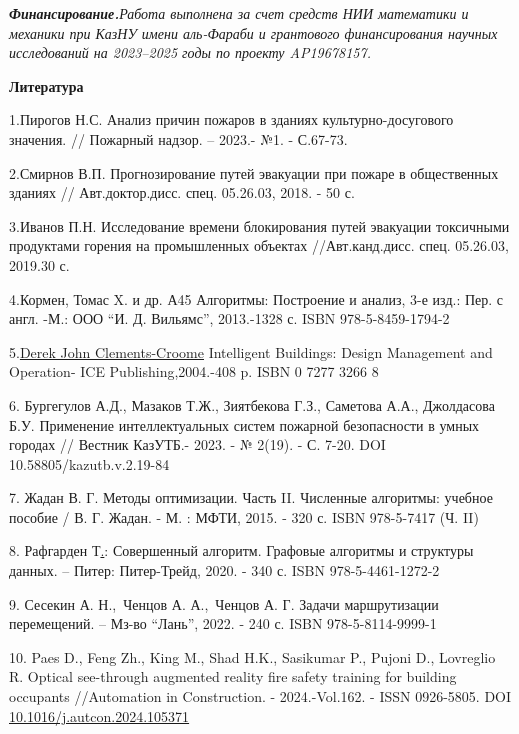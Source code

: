 \emph{{\bfseries Финансирование.}Работа выполнена за счет средств НИИ
математики и механики при КазНУ имени аль-Фараби и грантового
финансирования научных исследований на 2023--2025 годы по проекту
AP19678157.}

{\bfseries Литература}

1.Пирогов Н.С. Анализ причин пожаров в зданиях культурно-досугового
значения. // Пожарный надзор. -- 2023.- №1. - С.67-73.

2.Смирнов В.П. Прогнозирование путей эвакуации при пожаре в общественных
зданиях // Авт.доктор.дисс. спец. 05.26.03, 2018. - 50 с.

3.Иванов П.Н. Исследование времени блокирования путей эвакуации
токсичными продуктами горения на промышленных объектах //Авт.канд.дисс.
спец. 05.26.03, 2019.30 с.

4.Кормен, Томас X. и др. А45 Алгоритмы: Построение и анализ, 3-е изд.:
Пер. с англ. -М.: ООО ``И. Д. Вильямс'', 2013.-1328 с. ISBN
978-5-8459-1794-2

5.\href{https://www.researchgate.net/profile/Derek-Clements-Croome}{Derek
John Clements-Croome} Intelligent Buildings: Design Management and
Operation- ICE Publishing,2004.-408 p. ISBN 0 7277 3266 8

6. Бургегулов А.Д., Мазаков Т.Ж., Зиятбекова Г.З., Саметова А.А.,
Джолдасова Б.У. Применение интеллектуальных систем пожарной безопасности
в умных городах // Вестник КазУТБ.- 2023. - № 2(19). - С. 7-20. DOI
10.58805/kazutb.v.2.19-84

7. Жадан В. Г. Методы оптимизации. Часть II. Численные алгоритмы:
учебное пособие / В. Г. Жадан. - М. : МФТИ, 2015. - 320 с. ISBN
978-5-7417 (Ч. II)

8. Рафгарден
Т\href{https://www.meloman.kz/other/rafgarden-t-sovershennyj-algoritm-grafovye-algoritmy-i-struktury-dannyh.html?srsltid=AfmBOoonzl3DLF5EZHXaStUKbeOPMt0iOX2nrgpmPI-HIND3-7hOvRYs}{.}:
Совершенный алгоритм. Графовые алгоритмы и структуры данных. -- Питер:
Питер-Трейд, 2020. - 340 с. ISBN 978-5-4461-1272-2

9. Сесекин А. Н.,~Ченцов А. А.,~Ченцов А. Г. Задачи маршрутизации
перемещений. -- Мз-во ``Лань'', 2022. - 240 с. ISBN 978-5-8114-9999-1

10. Paes D., Feng Zh., King M., Shad H.K., Sasikumar P., Pujoni D.,
Lovreglio R. Optical see-through augmented reality fire safety training
for building occupants //Automation in Construction. - 2024.-Vol.162. -
ISSN 0926-5805. DOI
\href{https://doi.org/10.1016/j.autcon.2024.105371}{10.1016/j.autcon.2024.105371}

